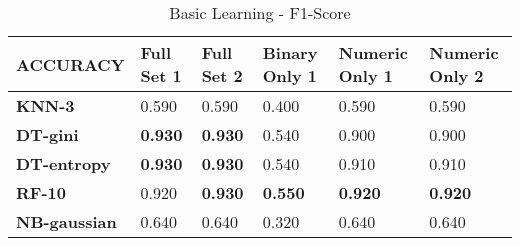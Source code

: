 \documentclass[10pt, conference, compsocconf]{IEEEtran}
\begin{document}
\begin{center}
	\begin{table}[ht]
		\centering \footnotesize
		\vspace{-2mm}
		\caption{Basic Learning - F1-Score}
		\hspace{1cm}
		\begin{tabularx}{\linewidth}{ l  X  X  X  X  X }
			\hline
			\textbf{ACCURACY} &	\textbf{Full Set 1}&	\textbf{Full Set 2}&	\textbf{Binary Only 1}&	\textbf{Numeric Only 1}&	\textbf{Numeric Only 2} \\ \hline
			
			
			\textbf{KNN-3}&	0.590&	0.590&	0.400&	0.590&	0.590\\ \hline
			\textbf{DT-gini}&	\textbf{0.930}&	\textbf{0.930}&	0.540&	0.900&	0.900\\ \hline
			\textbf{DT-entropy}&	\textbf{0.930}&	\textbf{0.930}&	0.540&	0.910&	0.910\\ \hline
			\textbf{RF-10}&	0.920&	\textbf{0.930}&	\textbf{0.550}&	\textbf{0.920}&	\textbf{0.920}\\ \hline
			\textbf{NB-gaussian}&	0.640&	0.640&	0.320&	0.640&	0.640\\ \hline
			
			
		\end{tabularx}\newline
		\vspace{-2mm}
		\label{Table2}
	\end{table} \hfil
\end{center}
\end{document}

